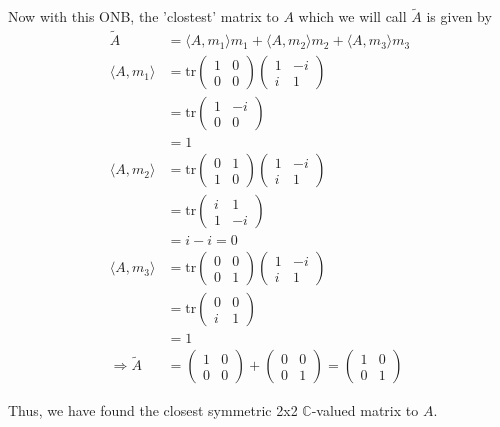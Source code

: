 \documentclass[a4paper, 11pt]{article}
\newcommand{\C}{\mathbb{C}}
\newenvironment{solution}{%
	\begin{list}{}{%
			\setlength{\topsep}{0pt}%
			\setlength{\leftmargin}{1.5cm}%
			\setlength{\rightmargin}{1.5cm}%
			\setlength{\listparindent}{\parindent}%
			\setlength{\itemindent}{\parindent}%
			\setlength{\parsep}{\parskip}%
		}%
		\item[]}{\end{list}}
\begin{document}
\begin{solution}
\noindent Now with this ONB, the 'clostest' matrix to $A$ which we will call $\tilde{A}$ is given by
\begin{align*}
  \tilde{A} &= \langle A, m_1\rangle m_1 + \langle A, m_2 \rangle m_2 + \langle A, m_3 \rangle m_3\\
  \langle A, m_1 \rangle &= \text{tr}\begin{pmatrix}1 & 0 \\ 0 & 0 \end{pmatrix}\begin{pmatrix}1 & -i \\ i & 1\end{pmatrix} \\
    &= \text{tr}\begin{pmatrix}1 & -i \\ 0 & 0 \end{pmatrix}\\
    &= 1\\
   \langle A, m_2 \rangle &= \text{tr}\begin{pmatrix}0 & 1 \\ 1 & 0 \end{pmatrix}\begin{pmatrix}1 & -i \\ i & 1\end{pmatrix} \\
    &= \text{tr}\begin{pmatrix}i & 1 \\ 1 & -i \end{pmatrix}\\
    &= i-i = 0 \\
    \langle A, m_3 \rangle &= \text{tr}\begin{pmatrix}0 & 0 \\ 0 & 1 \end{pmatrix}\begin{pmatrix}1 & -i \\ i & 1\end{pmatrix} \\
    &= \text{tr}\begin{pmatrix}0 & 0 \\ i & 1 \end{pmatrix}\\
    &= 1 \\
    \Rightarrow \tilde{A} &= \begin{pmatrix}1 & 0 \\ 0 & 0 \end{pmatrix} + \begin{pmatrix}0 & 0 \\ 0 & 1 \end{pmatrix} = \begin{pmatrix}1 & 0 \\ 0 & 1 \end{pmatrix} 
\end{align*}

\noindent Thus, we have found the closest symmetric 2x2 $\C$-valued matrix to $A$. \\
\end{solution}
\end{document}
